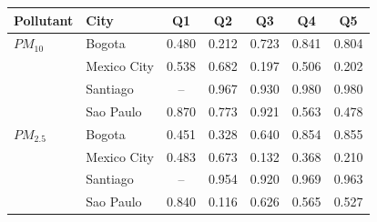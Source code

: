 \begin{tabular}{llccccc}
\toprule
Pollutant & City & Q1 & Q2 & Q3 & Q4 & Q5 \\
\midrule
$PM_{10}$ & Bogota & 0.480 & 0.212 & 0.723 & 0.841 & 0.804 \\
 & Mexico City & 0.538 & 0.682 & 0.197 & 0.506 & 0.202 \\
 & Santiago & -- & 0.967 & 0.930 & 0.980 & 0.980 \\
 & Sao Paulo & 0.870 & 0.773 & 0.921 & 0.563 & 0.478 \\
\addlinespace
$PM_{2.5}$ & Bogota & 0.451 & 0.328 & 0.640 & 0.854 & 0.855 \\
 & Mexico City & 0.483 & 0.673 & 0.132 & 0.368 & 0.210 \\
 & Santiago & -- & 0.954 & 0.920 & 0.969 & 0.963 \\
 & Sao Paulo & 0.840 & 0.116 & 0.626 & 0.565 & 0.527 \\
\bottomrule
\end{tabular}
